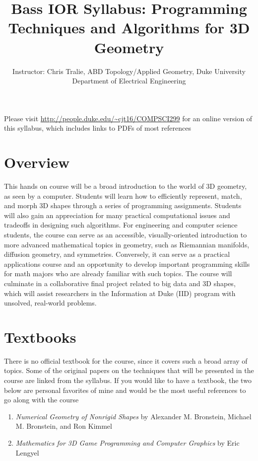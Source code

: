 \documentclass{article}
\title{Bass IOR Syllabus: Programming Techniques and Algorithms for 3D Geometry}
\author{Instructor: Chris Tralie, ABD Topology/Applied Geometry, Duke University Department of Electrical Engineering}
\begin{document}
\maketitle

Please visit \url{http://people.duke.edu/~cjt16/COMPSCI299} for an online version of this syllabus, which includes links to PDFs of most references

\section{Overview}
This hands on course will be a broad introduction to the world of 3D geometry, as seen by a computer. Students will learn how to efficiently represent, match, and morph 3D shapes through a series of programming assignments. Students will also gain an appreciation for many practical computational issues and tradeoffs in designing such algorithms. For engineering and computer science students, the course can serve as an accessible, visually-oriented introduction to more advanced mathematical topics in geometry, such as Riemannian manifolds, diffusion geometry, and symmetries. Conversely, it can serve as a practical applications course and an opportunity to develop important programming skills for math majors who are already familiar with such topics.  The course will culminate in a collaborative final project related to big data and 3D shapes, which will assist researchers in the Information at Duke (IID) program with unsolved, real-world problems.

\section{Textbooks}
There is no official textbook for the course, since it covers such a broad array of topics. Some of the original papers on the techniques that will be presented in the course are linked from the syllabus. If you would like to have a textbook, the two below are personal favorites of mine and would be the most useful references to go along with the course 

\begin{enumerate}

\item {\em Numerical Geometry of Nonrigid Shapes} by Alexander M. Bronstein, Michael M. Bronstein, and Ron Kimmel \cite{Bronstein2008}

\item {\em Mathematics for 3D Game Programming and Computer Graphics} by Eric Lengyel \cite{lengyel2012mathematics}

\end{enumerate}
\end{document}
